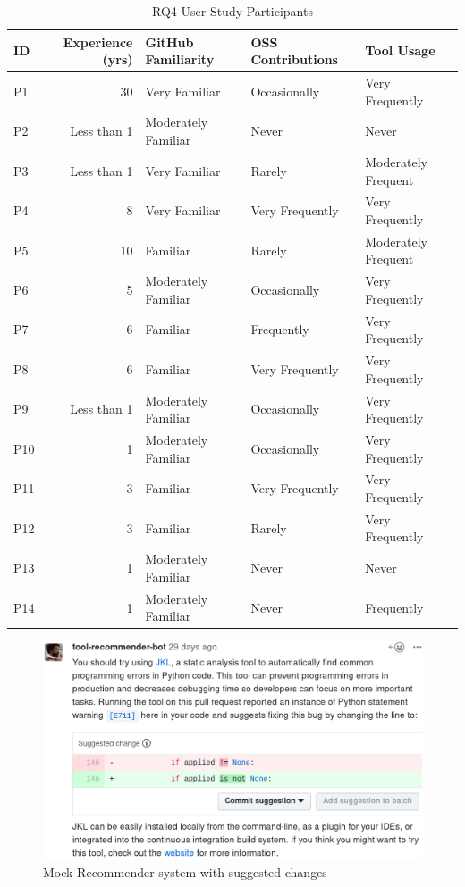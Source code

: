 \begin{table}[]
\centering
\begin{tabular}{ lrlll } \hline
  \textbf{ID} & \textbf{Experience (yrs)} & \textbf{GitHub Familiarity} & \textbf{OSS Contributions} & \textbf{Tool Usage} \\ \hline
 P1 & 30 & Very Familiar & Occasionally & Very Frequently \\  
 P2 & Less than 1 & Moderately Familiar & Never & Never \\ 
 P3 & Less than 1 & Very Familiar & Rarely & Moderately Frequent \\  
 P4 & 8 & Very Familiar & Very Frequently & Very Frequently \\ 
 P5 & 10 & Familiar & Rarely & Moderately Frequent \\
 P6 & 5 & Moderately Familiar & Occasionally & Very Frequently \\
 P7 & 6 & Familiar & Frequently & Very Frequently \\
 P8 & 6 & Familiar & Very Frequently & Very Frequently \\
 P9 & Less than 1 & Moderately Familiar & Occasionally & Very Frequently \\
 P10 & 1 & Moderately Familiar & Occasionally & Very Frequently \\
 P11 & 3 & Familiar & Very Frequently & Very Frequently \\
 P12 & 3 & Familiar & Rarely & Very Frequently \\
 P13 & 1 & Moderately Familiar & Never & Never \\
 P14 & 1 & Moderately Familiar & Never & Frequently \\
 \hline
 
\end{tabular}
\caption{RQ4 User Study Participants}
\label{tab:participants}
\end{table}

\begin{figure}[]
	\includegraphics[width=\textwidth]{images/auto_suggest.png}
	\caption{Mock Recommender system with suggested changes}	
	\label{fig:tool} 
\end{figure}


